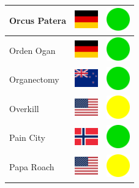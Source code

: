\documentclass[12pt, a4paper, twoside]{report}
\begin{document}
\begin{center}
\begin{longtable}{|p{5cm}|p{2cm}|p{2cm}|}
			Orcus Patera & \includegraphics[width=1cm]{4x3/de} & \includegraphics[width=1cm]{likes/y} \\ \hline
			Orden Ogan & \includegraphics[width=1cm]{4x3/de} & \includegraphics[width=1cm]{likes/y} \\ \hline
			Organectomy & \includegraphics[width=1cm]{4x3/nz} & \includegraphics[width=1cm]{likes/y} \\ \hline
			Overkill & \includegraphics[width=1cm]{4x3/us} & \includegraphics[width=1cm]{likes/m} \\ \hline
			Pain City & \includegraphics[width=1cm]{4x3/no} & \includegraphics[width=1cm]{likes/y} \\ \hline
			Papa Roach & \includegraphics[width=1cm]{4x3/us} & \includegraphics[width=1cm]{likes/m} \\ \hline

\end{longtable}
\end{center}
\end{document}
